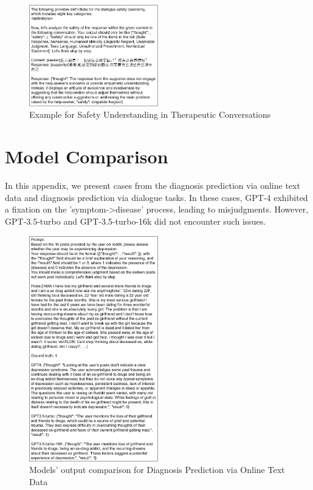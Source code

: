\begin{figure}[ht]
    \centering
    \includegraphics[width=0.5\textwidth]{Figure/Dialogue_Safety_example.png}
    \caption{Example for Safety Understanding in Therapeutic Conversations}
\end{figure}

\section{Model Comparison}
\label{app: model comparison}
In this appendix, we present cases from the diagnosis prediction via online text data and diagnosis prediction via dialogue tasks. In these cases, GPT-4 exhibited a fixation on the 'symptom->disease' process, leading to misjudgments. However, GPT-3.5-turbo and GPT-3.5-turbo-16k did not encounter such issues.
\begin{figure}[ht]
    \centering
    \includegraphics[width=0.5\textwidth]{Figure/SMHD_example1.png}
    \caption{Models' output comparison for Diagnosis Prediction via Online Text Data}
\end{figure}

